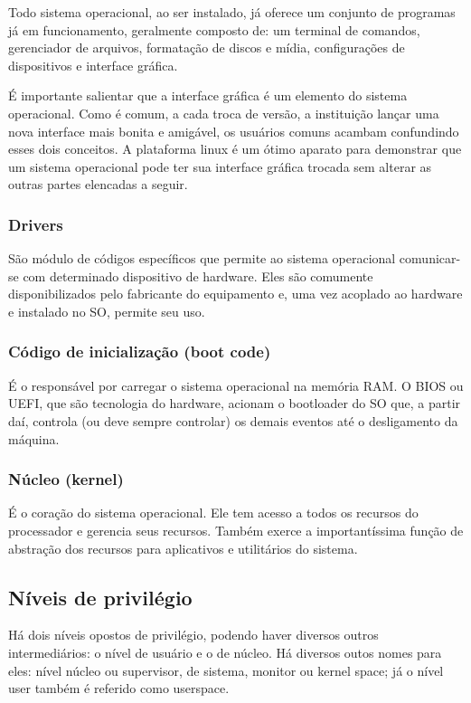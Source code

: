 \documentclass[conference]{IEEEtran}
\begin{document}
Todo sistema operacional, ao ser instalado, já oferece um conjunto de programas já em funcionamento, geralmente composto de: um terminal de comandos, gerenciador de arquivos, formatação de discos e mídia, configurações de dispositivos e interface gráfica. 

É importante salientar que a interface gráfica é um elemento do sistema operacional. Como é comum, a cada troca de versão, a instituição lançar uma nova interface mais bonita e amigável, os usuários comuns acambam confundindo esses dois conceitos. A plataforma linux é um ótimo aparato para demonstrar que um sistema operacional pode ter sua interface gráfica trocada sem alterar as outras partes elencadas a seguir.

\subsubsection{Drivers}

São módulo de códigos específicos que permite ao sistema operacional comunicar-se com determinado dispositivo de hardware. Eles são comumente disponibilizados pelo fabricante do equipamento e, uma vez acoplado ao hardware e instalado no SO, permite seu uso.

\subsubsection{Código de inicialização (boot code)}

É o responsável por carregar o sistema operacional na memória RAM. O BIOS ou UEFI, que são tecnologia do hardware, acionam o bootloader do SO que, a partir daí, controla (ou deve sempre controlar) os demais eventos até o desligamento da máquina.

\subsubsection{Núcleo (kernel)}

É o coração do sistema operacional. Ele tem acesso a todos os recursos do processador e gerencia seus recursos. Também exerce a importantíssima função de abstração dos recursos para aplicativos e utilitários do sistema.

\subsection{Níveis de privilégio}

Há dois níveis opostos de privilégio, podendo haver diversos outros intermediários: o nível de usuário e o de núcleo. Há diversos outos nomes para eles: nível núcleo ou supervisor, de sistema, monitor ou kernel space; já o nível user também é referido como userspace. 
\end{document}
